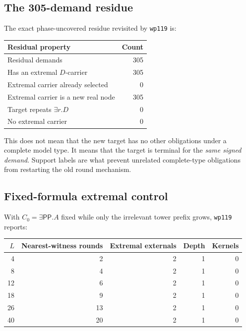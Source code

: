\documentclass[11pt,letterpaper]{article}
\newcommand{\PP}{\ensuremath{\mathsf{PP}}}
\newcommand{\code}[1]{\nolinkurl{#1}}
\theoremstyle{definition}
\theoremstyle{plain}
\theoremstyle{remark}
\begin{document}
\subsection{The 305-demand residue}

The exact phase-uncovered residue revisited by \code{wp119} is:

\begin{center}
\begin{tabular}{lr}
\toprule
Residual property & Count \\
\midrule
Residual demands & 305 \\
Has an extremal $D$-carrier & 305 \\
Extremal carrier already selected & 0 \\
Extremal carrier is a new real node & 305 \\
Target repeats $\exists r.D$ & 0 \\
No extremal carrier & 0 \\
\bottomrule
\end{tabular}
\end{center}

This does not mean that the new target has no other obligations under a complete
model type.  It means that the target is terminal for the \emph{same signed
demand}.  Support labels are what prevent unrelated complete-type obligations
from restarting the old round mechanism.

\subsection{Fixed-formula extremal control}

With $C_0=\exists\PP.A$ fixed while only the irrelevant tower prefix grows,
\code{wp119} reports:

\begin{center}
\begin{tabular}{rrrrr}
\toprule
$L$ & Nearest-witness rounds & Extremal externals & Depth & Kernels \\
\midrule
4  & 2  & 2 & 1 & 0 \\
8  & 4  & 2 & 1 & 0 \\
12 & 6  & 2 & 1 & 0 \\
18 & 9  & 2 & 1 & 0 \\
26 & 13 & 2 & 1 & 0 \\
40 & 20 & 2 & 1 & 0 \\
\bottomrule
\end{tabular}
\end{center}
\end{document}
